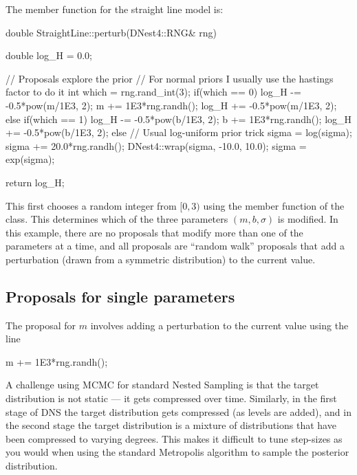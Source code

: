 \documentclass[article]{jss}
\begin{document}
The  member function for the straight line model is:
\begin{CodeChunk}
\begin{CodeInput}
double StraightLine::perturb(DNest4::RNG& rng)
{
	double log_H = 0.0;

	// Proposals explore the prior
	// For normal priors I usually use the hastings factor to do it
	int which = rng.rand_int(3);
	if(which == 0)
	{
		log_H -= -0.5*pow(m/1E3, 2);
		m += 1E3*rng.randh();
		log_H += -0.5*pow(m/1E3, 2);
	}
	else if(which == 1)
	{
		log_H -= -0.5*pow(b/1E3, 2);
		b += 1E3*rng.randh();
		log_H += -0.5*pow(b/1E3, 2);
	}
	else
	{
		// Usual log-uniform prior trick
		sigma = log(sigma);
		sigma += 20.0*rng.randh();
		DNest4::wrap(sigma, -10.0, 10.0);
		sigma = exp(sigma);
	}

	return log_H;
}
\end{CodeInput}
\end{CodeChunk}

This first chooses a random integer from $[0, 3)$ using the
 member function of the  class.
This determines which of the three parameters
$(m, b, \sigma)$ is modified. In this example, there are no proposals
that modify more than one of the parameters at a time, and all proposals
are ``random walk'' proposals that add a perturbation
(drawn from a symmetric distribution) to the current value.

\subsection{Proposals for single parameters}
The proposal for $m$ involves adding a perturbation to the current
value using the line

\begin{CodeChunk}
\begin{CodeInput}
m += 1E3*rng.randh();
\end{CodeInput}
\end{CodeChunk}

A challenge using MCMC for standard Nested Sampling is that the target
distribution is not static --- it gets compressed over time. Similarly, in
the first stage of DNS the target distribution gets compressed (as levels are
added), and in the second stage the target distribution is a mixture of
distributions that have been compressed to varying degrees.
This makes it difficult to tune step-sizes as you would when using
the standard Metropolis algorithm to sample the posterior distribution.
\end{document}
